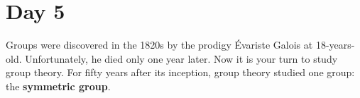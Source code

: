 \documentclass[11pt]{article}
\begin{document}



\newpage

\section{Day 5}

Groups were discovered in the 1820s by the prodigy Évariste Galois at 18-years-old. Unfortunately, he died only one year later. Now it is your turn to study group theory. For fifty years after its inception, group theory studied one group: the \textbf{symmetric group}.
\end{document}

